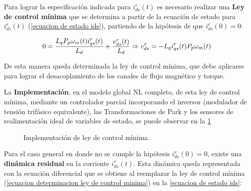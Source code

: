 \documentclass[a4paper, 10pt, onecolumn,journal]{ieeeconf}
\begin{document}
Para lograr la especificación indicada para $i^r_{ds}(t)$ es necesario realizar una \textbf{Ley de control mínima} que se determina a partir de la ecuación de estado para $i^{r}_{ds}(t)$ (\cref{ecuacion de estado ids}), partiendo de la hipótesis de que $i^{r}_{ds}(0)=0$:

\begin{equation}
	0= \frac{L_q P_p \omega_m(t)i^r_{qs}(t)}{L_d}  + \frac{v^r_{ds}(t)}{L_d}\Rightarrow	v^{r}_{ds}= -L_{q}i^{r}_{qs}(t)P_{p}\omega_{m}(t)\\
	\label{ecuacion determinacion ley de control minima}
\end{equation}

De esta manera queda determinada la ley de control mínima, que debe aplicarse para lograr el desacoplamiento de los canales de flujo magnético y torque.

La \textbf{Implementación}, en el modelo global NL completo, de esta  ley de control mínima, mediante un controlador parcial incorporando el inversor (modulador de tensión trifásico equivalente), las Transformaciones de Park y los sensores de realimentación ideal de variables de estado,
se puede observar en la \cref{Implementación de ley de control mínima}

\begin{figure}[H]
	\centering
	\begin{adjustbox}{scale=0.7,max width=\columnwidth}
	\end{adjustbox}
	\caption{Implementación de ley de control mínima.}
	\label{Implementación de ley de control mínima}
\end{figure}

Para el caso general en donde no se cumple la hipótesis $i^{r}_{ds}(0)=0$, existe una \textbf{dinámica residual} en la corriente $i^{r}_{ds}(t)$. Esta dinámica queda representada con la ecuación diferencial que se obtiene al reemplazar la ley de control mínima (\cref{ecuacion determinacion ley de control minima}) en la \cref{ecuacion de estado ids}:
\end{document}
